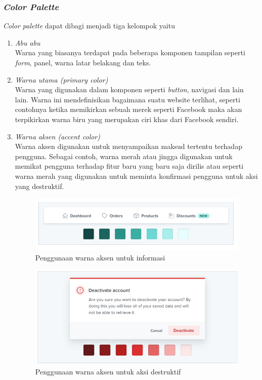 \subsubsection{\textit{Color Palette}}
\textit{Color palette} dapat dibagi menjadi tiga kelompok yaitu
\begin{enumerate}
	\item \emph{Abu abu} \hfill\\
	Warna yang biasanya terdapat pada beberapa komponen tampilan seperti \textit{form}, panel, warna latar belakang dan teks.
	\item \emph{Warna utama (\textit{primary color})} \hfill\\
	Warna yang digunakan dalam komponen seperti \textit{button}, navigasi dan lain lain. Warna ini mendefinisikan bagaimana suatu website terlihat, seperti contohnya ketika memikirkan sebuah merek seperti Facebook maka akan terpikirkan warna biru yang merupakan ciri khas dari Facebook sendiri.
	\item \emph{Warna aksen (\textit{accent color})} \hfill\\
	Warna aksen digunakan untuk menyampaikan maksud tertentu terhadap pengguna. Sebagai contoh, warna merah atau jingga digunakan untuk memikat pengguna terhadap fitur baru yang baru saja dirilis atau seperti warna merah yang digunakan untuk meminta konfirmasi pengguna untuk aksi yang destruktif.
	\begin{figure}[H]
		{\centering
			\includegraphics[keepaspectratio, width=12cm]{gambar/refactoring-ui-33.png}
			\caption{Penggunaan warna aksen untuk informasi \citep{refactoringui}}}
		\label{gambar:refactoring-ui-33.png}
	\end{figure}
	\begin{figure}[H]
		{\centering
			\includegraphics[keepaspectratio, width=12cm]{gambar/refactoring-ui-34.png}
			\caption{Penggunaan warna aksen untuk aksi destruktif \citep{refactoringui}}}
		\label{gambar:refactoring-ui-34.png}
	\end{figure}
\end{enumerate}

